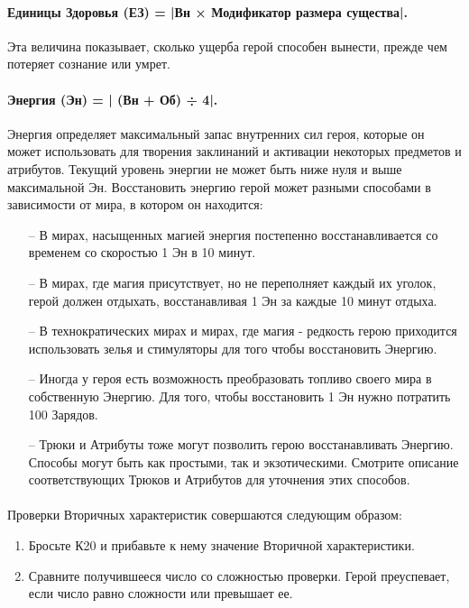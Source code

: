\paragraph{Единицы Здоровья (ЕЗ) = |Вн × Модификатор размера существа|.} Эта величина показывает, сколько ущерба герой способен вынести, прежде чем потеряет сознание или умрет.
\paragraph{Энергия (Эн) = | (Вн + Об) ÷ 4|.} Энергия определяет максимальный запас внутренних сил героя, которые он может использовать для творения заклинаний и активации некоторых предметов и атрибутов.
\newline
Текущий уровень энергии не может быть ниже нуля и выше максимальной Эн. Восстановить энергию герой может разными способами в зависимости от мира, в котором он находится:
\begin{itemize}
\item[--] В мирах, насыщенных магией энергия постепенно восстанавливается со временем со скоростью 1 Эн в 10 минут.
\item[--] В мирах, где магия присутствует, но не переполняет каждый их уголок, герой должен отдыхать, восстанавливая 1 Эн за каждые 10 минут отдыха.
\item[--] В технократических мирах и мирах, где магия - редкость герою приходится использовать зелья и стимуляторы для того чтобы восстановить Энергию.
\item[--] Иногда у героя есть возможность преобразовать топливо своего мира в собственную Энергию. Для того, чтобы восстановить 1 Эн нужно потратить 100 Зарядов.
\item[--] Трюки и Атрибуты тоже могут позволить герою восстанавливать Энергию. Способы могут быть как простыми, так и экзотическими. Смотрите описание соответствующих Трюков и Атрибутов для уточнения этих способов.
\end{itemize}
\paragraph{}Проверки Вторичных характеристик совершаются следующим образом:
\begin{enumerate}
\item Бросьте К20 и прибавьте к нему значение Вторичной характеристики.
\item Сравните получившееся число со сложностью проверки. Герой преуспевает, если число равно сложности или превышает ее.
\end{enumerate}
%